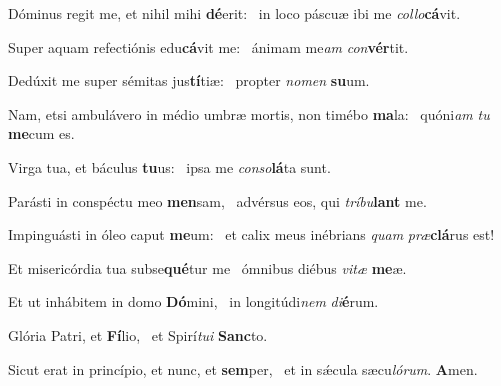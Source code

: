 \item Dóminus regit me, et nihil mihi \textbf{dé}erit:~\psstar{} in loco páscuæ ibi me \textit{collo}\textbf{cá}vit.
\item Super aquam refectiónis edu\textbf{cá}vit me:~\psstar{} ánimam me\textit{am} \textit{con}\textbf{vér}tit.
\item Dedúxit me super sémitas jus\textbf{tí}tiæ:~\psstar{} propter \textit{nomen} \textbf{su}um.
\item Nam, etsi ambulávero in médio umbræ mortis, non timébo \textbf{ma}la:~\psstar{} quóni\textit{am} \textit{tu} \textbf{me}cum es.
\item Virga tua, et báculus \textbf{tu}us:~\psstar{} ipsa me \textit{conso}\textbf{lá}ta sunt.
\item Parásti in conspéctu meo \textbf{men}sam,~\psstar{} advérsus eos, qui \textit{tríbu}\textbf{lant} me.
\item Impinguásti in óleo caput \textbf{me}um:~\psstar{} et calix meus inébrians \textit{quam} \textit{præ}\textbf{clá}rus est!
\item Et misericórdia tua subse\textbf{qué}tur me~\psstar{} ómnibus diébus \textit{vitæ} \textbf{me}æ.
\item Et ut inhábitem in domo \textbf{Dó}mini,~\psstar{} in longitúdi\textit{nem} \textit{di}\textbf{é}rum.
\item Glória Patri, et \textbf{Fí}lio,~\psstar{} et Spirí\textit{tui} \textbf{Sanc}to.
\item Sicut erat in princípio, et nunc, et \textbf{sem}per,~\psstar{} et in sǽcula sæcu\textit{lórum}. \textbf{A}men.
